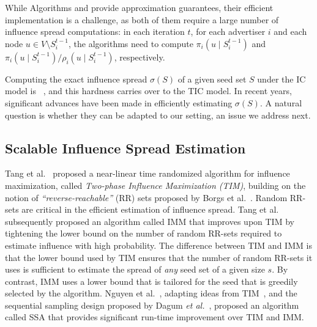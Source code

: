 While Algorithms \CARM and \CSRM provide approximation guarantees, their efficient implementation is a challenge, as both of them require a large number of influence spread computations: in each iteration $t$, for each advertiser $i$ and each node $u \in V \setminus S^{t-1}_i$, the algorithms need to compute $\pi_i(u \mid S^{t-1}_i)$ and $\pi_i(u \mid S^{t-1}_i) / \rho_i(u \mid S^{t-1}_i)$, respectively.

Computing the exact influence spread $\sigma(S)$ of a given seed set $S$ under the IC model is \SPhard~\cite{ChenWW10}, and this hardness carries over to the TIC model. In recent years, significant advances have been made in efficiently estimating $\sigma(S)$. A natural question is whether they can be adapted to our setting, an issue we address next.


\subsection{Scalable Influence Spread Estimation}

Tang et al.~\cite{tang14} %
proposed a near-linear time randomized algorithm for influence maximization, called {\em Two-phase Influence Maximization (TIM)}, building on the notion of \emph{``reverse-reachable''} (RR) sets proposed by Borgs et al.~\cite{borgs14}. Random RR-sets are critical in the efficient estimation of influence spread.
Tang et al.~\cite{tang2015influence} subsequently proposed an algorithm called IMM that improves upon TIM by tightening the lower bound on the number of random RR-sets required to estimate influence with high probability. The difference between TIM and IMM is that the lower bound used by TIM ensures that the number of random RR-sets it uses is sufficient to estimate the spread of \emph{any} seed set of a given size $s$. By contrast, IMM uses a lower bound that is tailored for the seed that is greedily selected by the algorithm. Nguyen et al.~\cite{NguyenTD16}, adapting ideas from TIM~\cite{tang14}, and the sequential sampling design proposed by Dagum \emph{et al.}~\cite{dagum2000optimal}, proposed an algorithm called SSA that provides significant run-time improvement over TIM and IMM.

